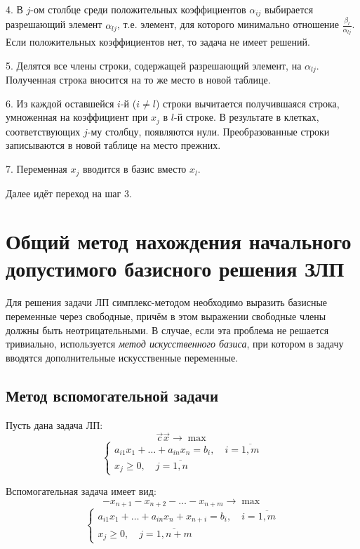 \documentclass[17pt]{extarticle}
\begin{document}
4. В \( j \)-ом столбце среди положительных коэффициентов \( \alpha_{ij} \) выбирается разрешающий элемент \( \alpha_{lj} \), т.е. элемент, для которого минимально отношение \( \frac{\beta_l}{\alpha_{lj}} \). Если положительных коэффициентов нет, то задача не имеет решений.

5. Делятся все члены строки, содержащей разрешающий элемент, на \( \alpha_{lj} \). Полученная строка вносится на то же место в новой таблице.

6. Из каждой оставшейся \( i \)-й (\( i \ne l \)) строки вычитается получившаяся строка, умноженная на коэффициент при \( x_j \) в \( l \)-й строке. В результате в клетках, соответствующих \( j \)-му столбцу, появляются нули. Преобразованные строки записываются в новой таблице на место прежних.

7. Переменная \( x_j \) вводится в базис вместо \( x_l \).

Далее идёт переход на шаг 3.




\section{Общий метод нахождения начального допустимого базисного решения ЗЛП}

Для решения задачи ЛП симплекс-методом необходимо выразить базисные переменные через свободные, причём в этом выражении свободные члены должны быть неотрицательными. В случае, если эта проблема не решается тривиально, используется \textit{метод искусственного базиса}, при котором в задачу вводятся дополнительные искусственные переменные.

\subsection{Метод вспомогательной задачи}

Пусть дана задача ЛП:
\[
    \vec{c}\vec{x} \to \max
\]
\[
    \begin{cases}
        a_{i1}x_1 + \dots + a_{in}x_n = b_i, \quad i = \overline{1,m} \\
        x_j \ge 0, \quad j = \overline{1,n}
    \end{cases}
\]

Вспомогательная задача имеет вид:
\[
    -x_{n+1} - x_{n+2} - \dots - x_{n+m} \to \max
\]
\[
    \begin{cases}
        a_{i1}x_1 + \dots + a_{in}x_n + x_{n+i} = b_i, \quad i = \overline{1,m} \\
        x_j \ge 0, \quad j = \overline{1,n+m}
    \end{cases}
\]
\end{document}
